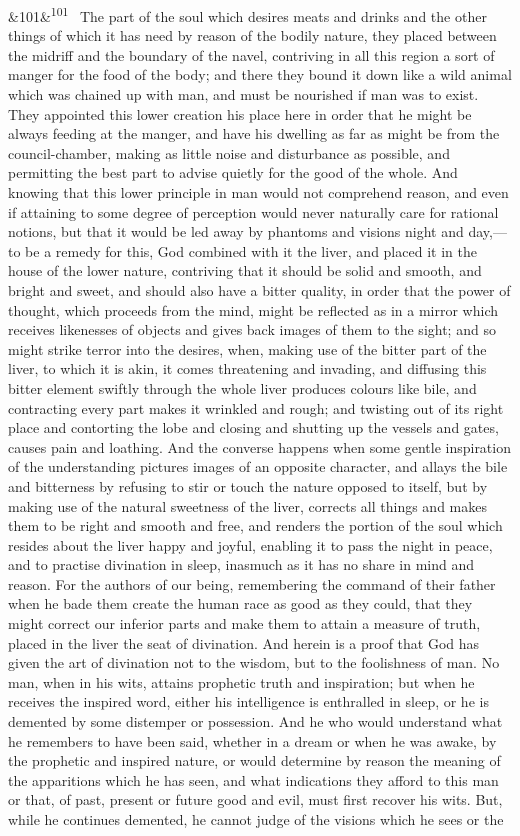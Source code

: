 \documentclass[12pt]{article}
\newcommand{\para}[1][]{\par\noindent\ifx&#1&\else\textsuperscript{\footnotesize #1}~\fi}
\begin{document}
\para[101] The part of the soul which desires meats and drinks and the other things of which it has need by reason of the bodily nature, they placed between the midriff and the boundary of the navel, contriving in all this region a sort of manger for the food of the body; and there they bound it down like a wild animal which was chained up with man, and must be nourished if man was to exist. They appointed this lower creation his place here in order that he might be always feeding at the manger, and have his dwelling as far as might be from the council-chamber, making as little noise and disturbance as possible, and permitting the best part to advise quietly for the good of the whole. And knowing that this lower principle in man would not comprehend reason, and even if attaining to some degree of perception would never naturally care for rational notions, but that it would be led away by phantoms and visions night and day,---to be a remedy for this, God combined with it the liver, and placed it in the house of the lower nature, contriving that it should be solid and smooth, and bright and sweet, and should also have a bitter quality, in order that the power of thought, which proceeds from the mind, might be reflected as in a mirror which receives likenesses of objects and gives back images of them to the sight; and so might strike terror into the desires, when, making use of the bitter part of the liver, to which it is akin, it comes threatening and invading, and diffusing this bitter element swiftly through the whole liver produces colours like bile, and contracting every part makes it wrinkled and rough; and twisting out of its right place and contorting the lobe and closing and shutting up the vessels and gates, causes pain and loathing. And the converse happens when some gentle inspiration of the understanding pictures images of an opposite character, and allays the bile and bitterness by refusing to stir or touch the nature opposed to itself, but by making use of the natural sweetness of the liver, corrects all things and makes them to be right and smooth and free, and renders the portion of the soul which resides about the liver happy and joyful, enabling it to pass the night in peace, and to practise divination in sleep, inasmuch as it has no share in mind and reason. For the authors of our being, remembering the command of their father when he bade them create the human race as good as they could, that they might correct our inferior parts and make them to attain a measure of truth, placed in the liver the seat of divination. And herein is a proof that God has given the art of divination not to the wisdom, but to the foolishness of man. No man, when in his wits, attains prophetic truth and inspiration; but when he receives the inspired word, either his intelligence is enthralled in sleep, or he is demented by some distemper or possession. And he who would understand what he remembers to have been said, whether in a dream or when he was awake, by the prophetic and inspired nature, or would determine by reason the meaning of the apparitions which he has seen, and what indications they afford to this man or that, of past, present or future good and evil, must first recover his wits. But, while he continues demented, he cannot judge of the visions which he sees or the 
\end{document}
